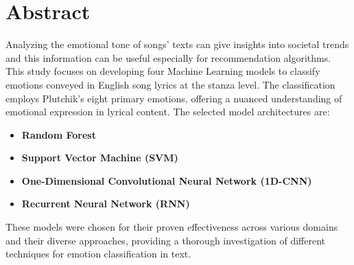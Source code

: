 \firstchapter
\chapter*{Abstract}
\label{ch:abstract}



Analyzing the emotional tone of songs' texts can give insights into societal trends and this information can be useful especially for recommendation
algorithms. This study focuses on developing four Machine Learning models to classify
emotions conveyed in English song lyrics at the stanza level. The
classification employs Plutchik's eight primary emotions,
offering a nuanced understanding of emotional expression in lyrical content.
The selected model architectures are:
\begin{itemize}
    \item \textbf{Random Forest}
    \item \textbf{Support Vector Machine (SVM)}
    \item \textbf{One-Dimensional Convolutional Neural Network (1D-CNN)}
    \item \textbf{Recurrent Neural Network (RNN)}
\end{itemize}
These models were chosen for their proven effectiveness across various
domains and their diverse approaches, providing a thorough
investigation of different techniques for emotion classification in text.\\
